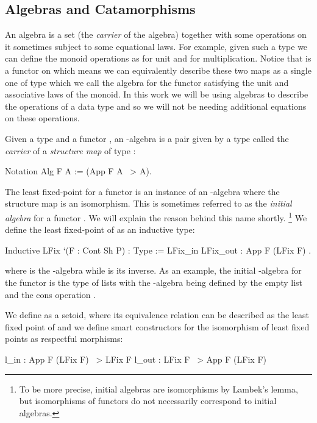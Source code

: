 \documentclass[ a4paper, UKenglish, cleveref, autoref, thm-restate]{lipics-v2021}
\begin{document}
\subsection{Algebras and Catamorphisms}
\label{sec:algebras} An algebra is a set  (the
\emph{carrier} of the algebra) together with some operations on it sometimes
subject to some equational laws. For example, given such a type  we can
define the monoid operations as  for unit
and  for multiplication. Notice
that  is a functor on  which means we can
equivalently describe these two maps as a single one of type 
which we call the algebra for the functor  satisfying the unit and
associative laws of the monoid. In this work we will be using algebras to
describe the operations of a data type and so we will not be needing additional
equations on these operations.

Given a type  and a functor , an -algebra is a pair given
by a type  called the \emph{carrier} of a \emph{structure map} of
type :
\begin{coqcode}
Notation Alg F A := (App F A ~> A).
\end{coqcode}
The least fixed-point for a functor  is an instance of an -algebra
where the structure map is an isomorphism. This is sometimes referred to as the
\emph{initial algebra} for a functor . We will explain the reason behind this name shortly. \footnote[1]{To be more precise,
initial algebras are isomorphisms by Lambek's lemma, but isomorphisms of
functors do not necessarily correspond to initial algebras.}  We define the
least fixed-point of  as an inductive type:
\begin{coqcode}
Inductive LFix `(F : Cont Sh P) : Type := LFix_in { LFix_out : App F (LFix F) }.
\end{coqcode}
where  is the -algebra while  is its inverse.
As an example, the initial -algebra for the
functor  is the type of lists with the -algebra
being defined by the empty list  and the cons
operation .

We define  as a setoid, where its equivalence relation can be
described as the least fixed point of  and we define smart
constructors for the isomorphism of least fixed points as respectful morphisms:
\begin{coqcode}
l_in : App F (LFix F) ~> LFix F                l_out : LFix F ~> App F (LFix F)
\end{coqcode}
\end{document}
